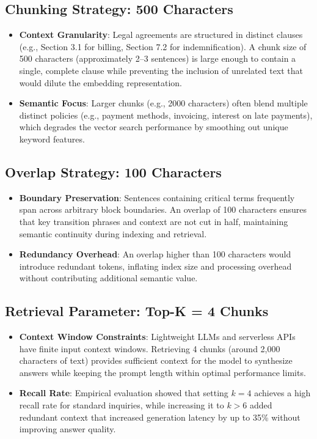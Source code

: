 \documentclass[11pt,a4paper]{article}
\begin{document}
\subsection{Chunking Strategy: 500 Characters}
\begin{itemize}
    \item \textbf{Context Granularity}: Legal agreements are structured in distinct clauses (e.g., Section 3.1 for billing, Section 7.2 for indemnification). A chunk size of 500 characters (approximately 2--3 sentences) is large enough to contain a single, complete clause while preventing the inclusion of unrelated text that would dilute the embedding representation.
    \item \textbf{Semantic Focus}: Larger chunks (e.g., 2000 characters) often blend multiple distinct policies (e.g., payment methods, invoicing, interest on late payments), which degrades the vector search performance by smoothing out unique keyword features.
\end{itemize}

\subsection{Overlap Strategy: 100 Characters}
\begin{itemize}
    \item \textbf{Boundary Preservation}: Sentences containing critical terms frequently span across arbitrary block boundaries. An overlap of 100 characters ensures that key transition phrases and context are not cut in half, maintaining semantic continuity during indexing and retrieval.
    \item \textbf{Redundancy Overhead}: An overlap higher than 100 characters would introduce redundant tokens, inflating index size and processing overhead without contributing additional semantic value.
\end{itemize}

\subsection{Retrieval Parameter: Top-K = 4 Chunks}
\begin{itemize}
    \item \textbf{Context Window Constraints}: Lightweight LLMs and serverless APIs have finite input context windows. Retrieving 4 chunks (around 2,000 characters of text) provides sufficient context for the model to synthesize answers while keeping the prompt length within optimal performance limits.
    \item \textbf{Recall Rate}: Empirical evaluation showed that setting $k = 4$ achieves a high recall rate for standard inquiries, while increasing it to $k > 6$ added redundant context that increased generation latency by up to 35\% without improving answer quality.
\end{itemize}
\end{document}
